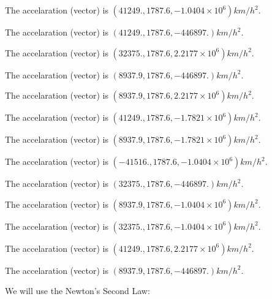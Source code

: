 \documentclass[12pt]{article}
\begin{document}
 
 
The accelaration (vector) is
$(
41249.,
1787.6 ,
-1.0404 \times 10^{6}
)km/h^2.
$
 
 
The accelaration (vector) is
$(
41249.,
1787.6 ,
-446897.
)km/h^2.
$
 
 
The accelaration (vector) is
$(
32375.,
1787.6 ,
2.2177 \times 10^{6}
)km/h^2.
$
 
 
The accelaration (vector) is
$(
8937.9,
1787.6 ,
-446897.
)km/h^2.
$
 
 
The accelaration (vector) is
$(
8937.9,
1787.6 ,
2.2177 \times 10^{6}
)km/h^2.
$
 
 
The accelaration (vector) is
$(
41249.,
1787.6 ,
-1.7821 \times 10^{6}
)km/h^2.
$
 
 
The accelaration (vector) is
$(
8937.9,
1787.6 ,
-1.7821 \times 10^{6}
)km/h^2.
$
 
 
The accelaration (vector) is
$(
-41516.,
1787.6 ,
-1.0404 \times 10^{6}
)km/h^2.
$
 
 
The accelaration (vector) is
$(
32375.,
1787.6 ,
-446897.
)km/h^2.
$
 
 
The accelaration (vector) is
$(
8937.9,
1787.6 ,
-1.0404 \times 10^{6}
)km/h^2.
$
 
 
The accelaration (vector) is
$(
32375.,
1787.6 ,
-1.0404 \times 10^{6}
)km/h^2.
$
 
 
The accelaration (vector) is
$(
41249.,
1787.6 ,
2.2177 \times 10^{6}
)km/h^2.
$
 
 
\noindent{}
 
 
The accelaration (vector) is
$(
8937.9,
1787.6 ,
-446897.
)km/h^2.
$
 
 
\noindent{}
 
 
 
 
 
 
\noindent{}
 
 

We will use the Newton's Second Law:
 
\end{document}
